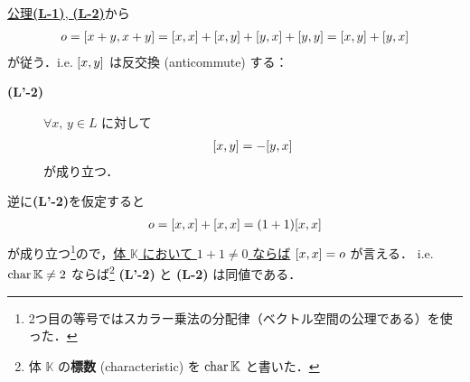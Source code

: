 \documentclass[rep_main]{subfiles}
\begin{document}
\hyperref[ax:LieAlg]{公理\textsf{\textbf{(L-1)}}, \textsf{\textbf{(L-2)}}}から
\begin{align}
    o = \comm{x+y}{x+y} = \comm{x}{x} + \comm{x}{y} + \comm{y}{x} + \comm{y}{y} = \comm{x}{y} + \comm{y}{x}
\end{align}
が従う．i.e. $\comm{x}{y}$ は反交換 (anticommute) する：
\begin{description}
    \item[\textbf{(L'-2)}] $\forall x,\, y \in L$ に対して
    \begin{align}
        \comm{x}{y} = -\comm{y}{x}
    \end{align}
    が成り立つ．
\end{description}
逆に\textsf{\textbf{(L'-2)}}を仮定すると
\begin{align}
    o = \comm{x}{x} + \comm{x}{x} = (1 + 1)\comm{x}{x}
\end{align}
が成り立つ\footnote{2つ目の等号ではスカラー乗法の分配律（ベクトル空間の公理である）を使った．}ので，\underline{体 $\mathbb{K}$ において $1 + 1 \neq 0$ ならば} $\comm{x}{x} = o$ が言える．
i.e. $\operatorname{char} \mathbb{K} \neq 2$ ならば\footnote{体 $\mathbb{K}$ の\textbf{標数} (characteristic) を $\operatorname{char} \mathbb{K}$ と書いた．} \textsf{\textbf{(L'-2)}} と \textsf{\textbf{(L-2)}} は同値である．
\end{document}
